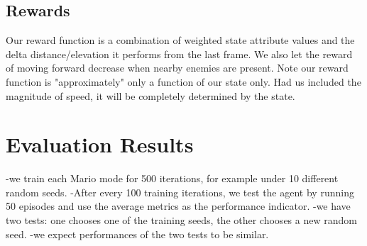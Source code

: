 \subsection{Rewards}
Our reward function is a combination of weighted state attribute values and the delta distance/elevation it performs from the last frame. We also let the reward of moving forward decrease when nearby enemies are present. Note our reward function is "approximately" only a function of our state only. Had us included the magnitude of speed, it will be completely determined by the state.

\section{Evaluation Results}
-we train each Mario mode for 500 iterations, for example under 10 different random seeds.
-After every 100 training iterations, we test the agent by running 50 episodes and use the average metrics as the performance indicator.
-we have two tests: one chooses one of the training seeds, the other chooses a new random seed.
-we expect performances of the two tests to be similar.





%
%

